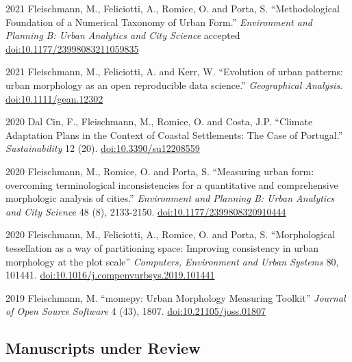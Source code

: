 \documentclass[12pt,a4paper]{report}
\begin{document}
    \begin{tablist}

        \item[2021] \tab{}Fleischmann, M., Feliciotti, A., Romice, O. and Porta, S. \enquote{Methodological Foundation of a Numerical Taxonomy of Urban Form.}  \textit{Environment and Planning B: Urban Analytics and City Science} accepted \href{https://doi.org/10.1177/23998083211059835}{doi:10.1177/23998083211059835}

        \item[2021] \tab{}Fleischmann, M., Feliciotti, A. and Kerr, W. \enquote{Evolution of urban patterns: urban morphology as an open reproducible data science.} \textit{Geographical Analysis}. \href{https://doi.org/10.1111/gean.12302}{doi:10.1111/gean.12302}

        \item[2020] \tab{}Dal Cin, F., Fleischmann, M., Romice, O. and Costa, J.P. \enquote{Climate Adaptation Plans in the Context of Coastal Settlements: The Case of Portugal.} \textit{Sustainability} 12 (20). \href{https://doi.org/10.3390/su12208559}{doi:10.3390/su12208559}

        \item[2020] \tab{}Fleischmann, M., Romice, O. and Porta, S. \enquote{Measuring urban form: overcoming terminological inconsistencies for a quantitative and comprehensive morphologic analysis of cities.} \textit{Environment and Planning B: Urban Analytics and City Science} 48 (8), 2133-2150. \href{https://doi.org/10.1177/2399808320910444}{doi:10.1177/2399808320910444}

        \item[2020] \tab{}Fleischmann, M., Feliciotti, A., Romice, O. and Porta, S. \enquote{Morphological tessellation as a way of partitioning space: Improving consistency in urban morphology at the plot scale} \textit{Computers, Environment and Urban Systems} 80, 101441. \href{https://doi.org/10.1016/j.compenvurbsys.2019.101441}{doi:10.1016/j.compenvurbsys.2019.101441}

        \item[2019] \tab{}Fleischmann, M. \enquote{momepy: Urban Morphology Measuring Toolkit} \textit{Journal of Open Source Software} 4 (43), 1807. \href{https://doi.org/10.21105/joss.01807}{doi:10.21105/joss.01807}


    \end{tablist}

    \subsection*{Manuscripts under Review}
\end{document}
